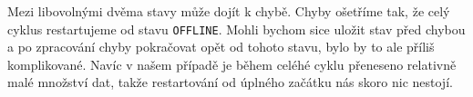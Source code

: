 Mezi libovolnými dvěma stavy může dojít k chybě.
Chyby ošetříme tak, že celý cyklus restartujeme od stavu \texttt{OFFLINE}.
Mohli bychom sice uložit stav před chybou a po zpracování chyby pokračovat opět od tohoto stavu,
bylo by to ale příliš komplikované.
Navíc v našem případě je během celéhé cyklu přeneseno relativně malé množství dat, takže restartování
od úplného začátku nás skoro nic nestojí.




